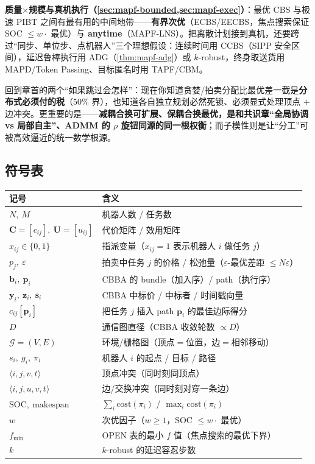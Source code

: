 \textbf{质量$\times$规模与真机执行（\cref{sec:mapf-bounded,sec:mapf-exec}）}：最优 CBS 与极速 PIBT 之间有最有用的中间地带——\textbf{有界次优}（ECBS/EECBS，焦点搜索保证 SOC $\le w\cdot$ 最优）与 \textbf{anytime}（MAPF-LNS）。把离散计划接到真机，还要跨过“同步、单位步、点机器人”三个理想假设：连续时间用 CCBS（SIPP 安全区间），延迟鲁棒执行用 ADG（\cref{thm:mapf-adg}）或 $k$-robust，终身取送货用 MAPD/Token Passing、目标匿名时用 TAPF/CBM。

回到章首的两个“如果跳过会怎样”：现在你知道贪婪/拍卖分配比最优差一截是\textbf{分布式必须付的税}（$50\%$ 界），也知道各自独立规划必然死锁、必须显式处理顶点 $+$ 边冲突。更重要的是——\textbf{减耦合换可扩展、保耦合换最优，是和共识章“全局协调 vs 局部自主”、ADMM 的 $\rho$ 旋钮同源的同一根权衡}；而子模性则是让“分工”可被高效逼近的统一数学根源。

\subsection*{符号表}
\begin{table}[H]\centering\small
\begin{tabular}{ll}
\toprule
记号 & 含义 \\
\midrule
$N,\ M$ & 机器人数 / 任务数 \\
$\mathbf{C}=[c_{ij}],\ \mathbf{U}=[u_{ij}]$ & 代价矩阵 / 效用矩阵 \\
$x_{ij}\in\{0,1\}$ & 指派变量（$x_{ij}=1$ 表示机器人 $i$ 做任务 $j$） \\
$p_j,\ \varepsilon$ & 拍卖中任务 $j$ 的价格 / 松弛量（$\varepsilon$-最优差距 $\le N\varepsilon$） \\
$\mathbf{b}_i,\ \mathbf{p}_i$ & CBBA 的 bundle（加入序）/ path（执行序） \\
$\mathbf{y}_i,\ \mathbf{z}_i,\ \mathbf{s}_i$ & CBBA 中标价 / 中标者 / 时间戳向量 \\
$c_{ij}[\mathbf{p}_i]$ & 把任务 $j$ 插入 path $\mathbf{p}_i$ 的最佳边际得分 \\
$D$ & 通信图直径（CBBA 收敛轮数 $\propto D$） \\
$\mathcal{G}=(V,E)$ & 环境/栅格图（顶点$=$位置，边$=$相邻移动） \\
$s_i,\ g_i,\ \pi_i$ & 机器人 $i$ 的起点 / 目标 / 路径 \\
$\langle i,j,v,t\rangle$ & 顶点冲突（同时刻同顶点） \\
$\langle i,j,u,v,t\rangle$ & 边/交换冲突（同时刻对穿一条边） \\
$\mathrm{SOC},\ \mathrm{makespan}$ & $\sum_i\mathrm{cost}(\pi_i)$ / $\max_i\mathrm{cost}(\pi_i)$ \\
$w$ & 次优因子（$w\ge 1$，SOC $\le w\cdot$ 最优） \\
$f_{\min}$ & OPEN 表的最小 $f$ 值（焦点搜索的最优下界） \\
$k$ & $k$-robust 的延迟容忍步数 \\
\bottomrule
\end{tabular}
\end{table}

